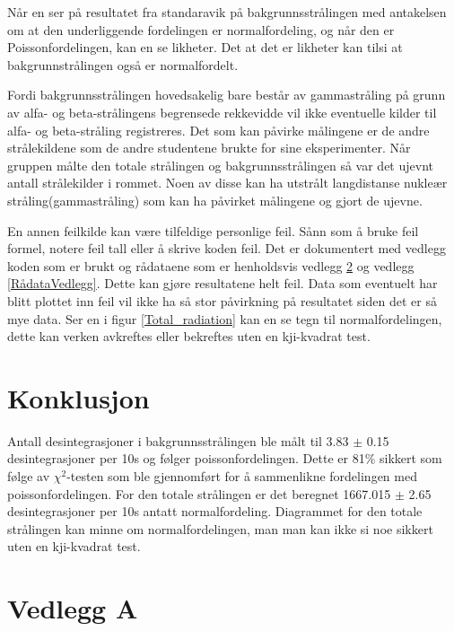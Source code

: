 \documentclass[twocolumn, 11pt]{article} %
\begin{document}
Når en ser på resultatet fra standaravik på bakgrunnsstrålingen med
antakelsen om at den underliggende fordelingen
er normalfordeling, og når den er Poissonfordelingen, kan en se likheter. Det at det er likheter kan tilsi at bakgrunnstrålingen også er normalfordelt.

Fordi bakgrunnsstrålingen hovedsakelig bare består av gammastråling på grunn av alfa- og beta-strålingens begrensede rekkevidde vil ikke eventuelle kilder til alfa- og beta-stråling registreres\cite{radioaktivitet}. Det som kan påvirke målingene er de andre strålekildene som de andre studentene brukte for sine eksperimenter. Når gruppen målte den totale strålingen og bakgrunnsstrålingen så var det ujevnt antall strålekilder i rommet. Noen av disse kan ha utstrålt langdistanse nukleær stråling(gammastråling) som kan ha påvirket målingene og gjort de ujevne.

En annen feilkilde kan være tilfeldige personlige feil. Sånn som å bruke feil formel, notere feil tall eller å skrive koden feil. Det er dokumentert med vedlegg koden som er brukt og rådataene som er henholdsvis vedlegg \ref{Python} og vedlegg \ref{RådataVedlegg}. Dette kan gjøre resultatene helt feil. Data som eventuelt har blitt plottet inn feil vil ikke ha så stor påvirkning på resultatet siden det er så mye data. Ser en i figur \ref{Total_radiation} kan en se tegn til normalfordelingen, dette kan verken avkreftes eller bekreftes uten en kji-kvadrat test.


\section{Konklusjon}
Antall desintegrasjoner i bakgrunnsstrålingen ble målt til 3.83 \textit{$\pm$} 0.15 desintegrasjoner per 10s og følger poissonfordelingen. Dette er 81$\%$ sikkert som følge av \textit{$\chi^2$}-testen som ble gjennomført for å sammenlikne fordelingen med poissonfordelingen. For den totale strålingen er det beregnet 1667.015 \textit{$\pm$} 2.65 desintegrasjoner per 10s antatt normalfordeling. Diagrammet for den totale strålingen kan minne om normalfordelingen, man man kan ikke si noe sikkert uten en kji-kvadrat test.




\clearpage

\onecolumn
\newpage
\appendix
\section{Vedlegg A}
\label{Python}
\end{document}
